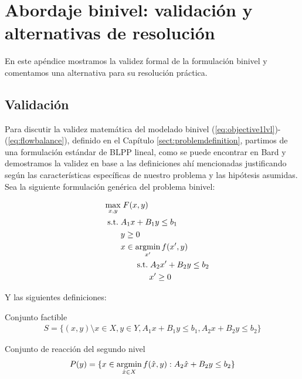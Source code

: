 \chapter{Abordaje binivel: validación y alternativas de resolución}
\label{sect:apendixbilevel}

En este apéndice mostramos la validez formal de la formulación binivel y comentamos una alternativa para su resolución práctica.

\section{Validación}
\label{sect:apendixbilevelvalidation}

Para discutir la validez matemática del modelado binivel (\ref{eq:objective1lvl})-(\ref{eq:flowbalance}), definido en el Capítulo \ref{sect:problemdefinition}, partimos de una formulación estándar de BLPP lineal, como se puede encontrar en Bard \textcite{bardbook} y demostramos la validez en base a las definiciones ahí mencionadas justificando según las características específicas de nuestro problema y las hipótesis asumidas. Sea la siguiente formulación genérica del problema binivel:

\begin{align}
\max_{x, y}               & \; F(x, y) \label{bilevelgeneric1} \\
\hspace{1.5em} \text{s.t.}\; & A_1 x + B_1 y \leq b_1 \\
                          & y \geq 0 \\
                          & x \in \mathop{\mathrm{argmin}}_{x'} f(x', y) \\
                          & \qquad \text{s.t.}\; A_2 x' + B_2 y \leq b_2 \label{bilevelgeneric5} \\
                          & \qquad \hspace{1.5em} x' \geq 0 \label{bilevelgeneric6}
\end{align}

\clearpage
Y las siguientes definiciones:

\begin{definition}
Conjunto factible
\begin{align}
  S = \{(x, y) \setminus x \in X, y \in Y, A_1 x + B_1 y \leq b_1, A_2 x + B_2 y \leq b_2 \}
\end{align}
\end{definition}

\begin{definition}
Conjunto de reacción del segundo nivel
\begin{align}
  P(y) = \{ x \in \mathop{\mathrm{argmin}}_{\hat{x} \in X} f(\hat{x}, y) : A_2 \hat{x} + B_2 y \leq b_2 \}
\end{align}
\end{definition}

